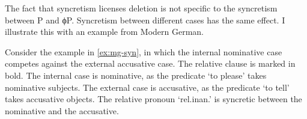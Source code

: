 %









The fact that syncretism licenses deletion is not specific to the syncretism between P and ϕP. Syncretism between different cases has the same effect. I illustrate this with an example from Modern German.

Consider the example in \ref{ex:mg-syn}, in which the internal nominative case competes against the external accusative case. The relative clause is marked in bold.
The internal case is nominative, as the predicate  `to please' takes nominative subjects.
The external case is accusative, as the predicate  `to tell' takes accusative objects.
The relative pronoun  `\ac{rel}.\ac{inan}.' is syncretic between the nominative and the accusative.

